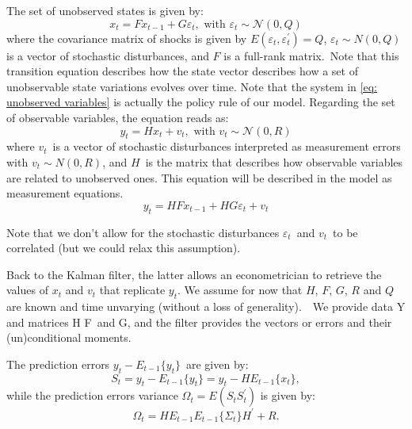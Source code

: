 \documentclass[a4paper,12pt]{article}%
\begin{document}
The set of unobserved states is given by:%
\begin{equation}
x_{t}=Fx_{t-1}+G\varepsilon_{t},\text{ with }\varepsilon_{t}\sim
\mathcal{N}(0,Q) \label{eq: unobserved variables}%
\end{equation}
where the covariance matrix of shocks is given by $E(\varepsilon_{t},\varepsilon_{t}^{\prime})=Q$,
$\varepsilon_{t}\sim N(0,Q)$ is a vector of stochastic disturbances, and $F$ is a full-rank
matrix.\ Note that this transition equation describes how the state vector
describes how a set of unobservable state variations evolves over time. Note
that the system in \autoref{eq: unobserved variables} is actually the policy
rule of our model. Regarding the set of observable variables, the equation
reads as:
\begin{equation}
y_{t}=Hx_{t}+v_{t},\text{ with }v_{t}\sim\mathcal{N}(0,R)
\label{eq: observed variables}%
\end{equation}
where $v_{t}$\ is a vector of stochastic disturbances interpreted as
measurement errors with $v_{t}\sim N(0,R)$, and $H$\ is the matrix that describes
how observable variables are related to unobserved ones. This equation will be
described in the model as \textsf{measurement equations}.%
\begin{equation}
y_{t}=HFx_{t-1}+HG\varepsilon_{t}+v_{t}%
\end{equation}


Note that we don't allow for the stochastic disturbances $\varepsilon_{t}$\ and
$v_{t}$\ to be correlated (but we could relax this assumption).

Back to the Kalman filter, the latter allows an econometrician to retrieve the
values of $x_{t}$ and $v_{t}$ that replicate $y_{t}$. We assume for
now that $H$, $F$, $G$, $R$ and $Q$ are known and time unvarying (without a
loss of generality).\ \ We provide data Y and matrices H F\ and G, and the
filter provides the vectors or errors and their (un)conditional moments.

The prediction errors $y_{t}-E_{t-1}\{y_{t}\}$\ are given by:%
\begin{equation}
S_{t}=y_{t}-E_{t-1}\{y_{t}\}=y_{t}-HE_{t-1}\{x_{t}\}, \label{eq KF1}%
\end{equation}
while the prediction errors variance $\Omega_{t}=E\left(  S_{t}S_{t}^{\prime
}\right)  $ is given by:
\begin{equation}
\Omega_{t}=HE_{t-1}E_{t-1}\{\Sigma_{t}\}H^{\prime}+R. \label{eq KF2}%
\end{equation}
\end{document}
